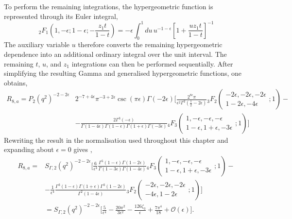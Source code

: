 To perform the remaining integrations, the hypergeometric function is represented through its
Euler integral,
\begin{equation}
    {}_2F_1\!\left(1,-\epsilon;1-\epsilon;-\frac{z_1t}{1-t}\right) = -\epsilon\int_0^1 du\,u^{-1-\epsilon}\!\left[1+\frac{uz_1t}{1-t}\right]^{-1}
\end{equation}
The auxiliary variable $u$ therefore converts the remaining hypergeometric dependence into an
additional ordinary integral over the unit interval. The remaining $t$, $u$, and $z_1$
integrations can then be performed sequentially. After simplifying the resulting Gamma and
generalised hypergeometric functions, one obtains,
\begin{equation}
    \begin{split}
        R_{8,a} = P_2\!\left(q^2\right)^{-2-2\epsilon}&2^{-7+4\epsilon}\pi^{-3+2\epsilon}\csc(\pi\epsilon)\Gamma(-2\epsilon)\Bigg[\frac{2^{8\epsilon}\pi}{\epsilon^2\Gamma^2\!\left(\frac12-2\epsilon\right)}{}_3F_2\!\left(\begin{array}{c} -2\epsilon, -2\epsilon, -2\epsilon \\ 1-2\epsilon, -4\epsilon \end{array};1\right)-\\
                                                      &-\frac{2\Gamma^3(-\epsilon)}{\Gamma(1-4\epsilon)\Gamma(1-\epsilon)\Gamma(1+\epsilon)\Gamma(-3\epsilon)}{}_4F_3\!\left(\begin{array}{c} 1, -\epsilon, -\epsilon, -\epsilon \\ 1-\epsilon, 1+\epsilon, -3\epsilon \end{array};1\right)\Bigg]
    \end{split}
\end{equation}
Rewriting the result in the normalisation used throughout this chapter and expanding about
$\epsilon=0$ gives \cite{GehrmannDeRidder0311276,TM_JoanaReis}, 
\begin{equation}
    \begin{split}
        R_{8,a} = &S_{\Gamma,2}\!\left(q^2\right)^{-2-2\epsilon}\Bigg[\frac6{\epsilon^4}\frac{\Gamma^5(1-\epsilon)\Gamma(1-2\epsilon)}{\Gamma(1-3\epsilon)\Gamma(1-4\epsilon)}{}_4F_3\!\left(\begin{array}{c} 1, -\epsilon, -\epsilon, -\epsilon \\ 1-\epsilon, 1+\epsilon, -3\epsilon \end{array};1\right)-\\
                  &-\frac1{\epsilon^4}\frac{\Gamma^3(1-\epsilon)\Gamma(1+\epsilon)\Gamma^3(1-2\epsilon)}{\Gamma^2(1-4\epsilon)}{}_3F_2\!\left(\begin{array}{c} -2\epsilon, -2\epsilon, -2\epsilon \\ -4\epsilon, 1-2\epsilon \end{array};1\right)\Bigg]\\
                  &=S_{\Gamma,2}\!\left(q^2\right)^{-2-2\epsilon}\Bigg[\frac5{\epsilon^4}-\frac{20\pi^2}{3\epsilon^2}-\frac{126\zeta_3}{\epsilon}+\frac{7\pi^4}{18}+\mathcal O(\epsilon)\Bigg].
    \end{split}
\end{equation}

